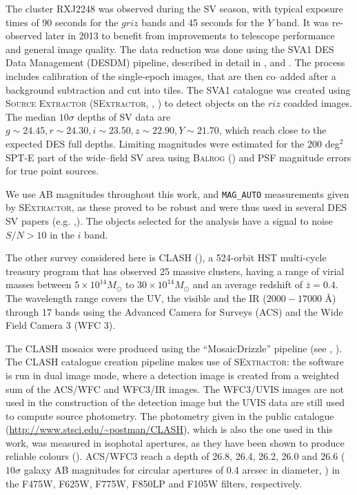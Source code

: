 {The cluster RXJ2248 was observed during the SV season, with typical exposure times of 90 seconds for the $griz$ bands and 45 seconds for the $Y$ band. It was re-observed later in 2013 to benefit from improvements to telescope performance and general image quality. The data reduction was done using the SVA1 DES Data Management (DESDM) pipeline, described in detail in \citet{sevilla}, \citet{desai} and \citet{dataproc}. The process includes calibration of the single-epoch images, that are then co--added after a background subtraction and cut into tiles. The SVA1 catalogue was created using \textsc{Source Extractor (SExtractor}, \citealt{sextractor1}, \citealt{sextractor}) to detect objects on the $riz$ coadded images. 
The median $10\sigma$ depths of SV data are $g\sim24.45, r\sim24.30,i\sim23.50,z\sim22.90, Y\sim21.70$, which reach close to the expected DES full depths. Limiting magnitudes were estimated for the 200 deg$^2$ SPT-E part of the wide--field SV area using \textsc{Balrog} (\citealt{suchyta}) and PSF magnitude errors for true point sources. 

We use AB magnitudes throughout this work, and \texttt{MAG\_AUTO} measurements given by \textsc{SExtractor}, as these proved to be robust and were thus used in several DES SV papers (e.g. \citealt{bonnett},\citealt{crocce}). The objects selected for the analysis have a signal to noise $S/N>10$ in the $i$ band.

The other survey considered here is CLASH (\citealt{postman}), a 524-orbit HST multi-cycle treasury program that has observed 25 massive clusters, having a range of virial masses between $5 \times 10^{14} M_\odot$ to $30 \times 10^{14} M_\odot$ and an average redshift of $\bar{z}=0.4$. The wavelength range covers the UV, the visible and the IR ($2000 - 17000 $ \AA) through 17 bands using the Advanced Camera for Surveys (ACS) and the Wide Field Camera 3 (WFC 3).

The CLASH mosaics were produced using the ``MosaicDrizzle'' pipeline (see \citealt{koekemoer02}, \citealt{koekemoer}). The CLASH catalogue creation pipeline makes use of \textsc{SExtractor}: the software is run in dual image mode, where a detection image is created from a weighted sum of the ACS/WFC and WFC3/IR images.  The WFC3/UVIS images are not used in the construction of the detection image but the UVIS data are still used to compute source photometry. The photometry given in the public catalogue (\url{http://www.stsci.edu/~postman/CLASH}), which is also the one used in this work, was measured in isophotal apertures, as they have been shown to produce reliable colours (\citealt{benitez}). ACS/WFC3 reach a depth of 26.8, 26.4, 26.2, 26.0 and 26.6 ($10\sigma$ galaxy AB magnitudes for circular apertures of 0.4 arcsec in diameter, \citealt{postman}) in the F475W, F625W, F775W, F850LP and F105W filters, respectively.

}
